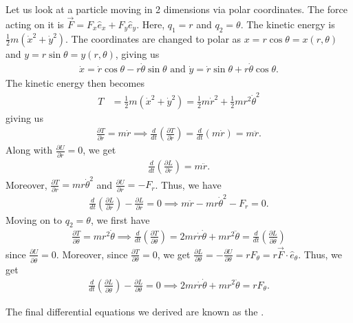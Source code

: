 \begin{example}
    Let us look at a particle moving in 2 dimensions via polar coordinates. The force acting on it is $\vec{F} = F_{x}\hat{e}_{x} + F_{y}\hat{e}_{y}$. Here, $q_{1} = r$ and $q_{2} = \theta$. The kinetic energy is $\frac{1}{2}m(\dot{x}^{2}+\dot{y}^{2})$. The coordinates are changed to polar as $x = r\cos\theta = x(r,\theta)$ and $y = r \sin \theta = y(r,\theta)$, giving us
    \begin{align}
        \dot{x} = \dot{r} \cos \theta - r \dot{\theta} \sin \theta \text{ and } \dot{y} = \dot{r} \sin \theta + r \dot{\theta} \cos \theta.
    \end{align}
    The kinetic energy then becomes
    \begin{align}
        T &= \frac{1}{2} m(\dot{x}^{2}+\dot{y}^{2}) = \frac{1}{2}m\dot{r}^{2} + \frac{1}{2} mr^{2}\dot{\theta}^{2}
    \end{align}
    giving us
    \begin{align}
        \frac{\partial T}{\partial \dot{r}} = m\dot{r} \implies \frac{d}{dt} \left( \frac{\partial T}{\partial \dot{r}} \right) = \frac{d}{dt} (m\dot{r}) = m\ddot{r}.
    \end{align}
    Along with $\frac{\partial U}{\partial \dot{r}} = 0$, we get
    \begin{align}
        \frac{d}{dt} \left( \frac{\partial L}{\partial \dot{r}} \right) = m\ddot{r}.
    \end{align}
    Moreover, $\frac{\partial T}{\partial r} = mr \dot{\theta}^{2}$ and $\frac{\partial U}{\partial r} = -F_{r}$. Thus, we have
    \begin{align}
        \frac{d}{dt}\left( \frac{\partial L}{\partial \dot{r}} \right) - \frac{\partial L}{\partial r} = 0 \implies m\ddot{r} - mr\dot{\theta}^{2} - F_{r} = 0.
    \end{align}
    Moving on to $q_{2} = \theta$, we first have
    \begin{align}
        \frac{\partial T}{\partial \dot{\theta}} = mr^{2}\dot{\theta} \implies \frac{d}{dt} \left( \frac{\partial T}{\partial \dot{\theta}} \right) = 2mr\dot{r}\dot{\theta} + mr^{2}\ddot{\theta} = \frac{d}{dt} \left( \frac{\partial L}{\partial \dot{\theta}} \right)
    \end{align}
    since $\frac{\partial U}{\partial \dot{\theta}} = 0$. Moreover, since $\frac{\partial T}{\partial \theta} = 0$, we get $\frac{\partial L}{\partial \theta} = -\frac{\partial U}{\partial \theta} = rF_{\theta} = r \vec{F} \cdot \hat{e}_{\theta}$. Thus, we get
    \begin{align}
        \frac{d}{dt}\left( \frac{\partial L}{\partial \dot{\theta}} \right) - \frac{\partial L}{\partial \theta} = 0 \implies 2mr\dot{r}\dot{\theta} + mr^{2}\ddot{\theta} = rF_{\theta}.
    \end{align}
\end{example}

The final differential equations we derived are known as the .